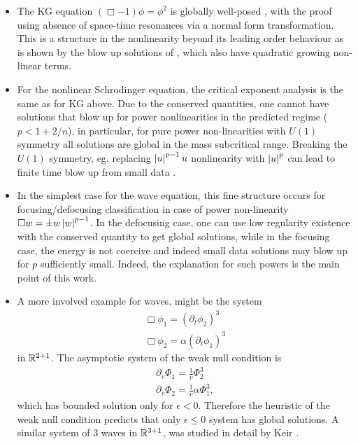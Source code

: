 \documentclass[11pt, oneside]{amsart}
\begin{document}
	\begin{itemize}
		\item The KG equation $(\Box-1)\phi=\phi^2$ is globally well-posed \cite{ozawa_global_1996}, with the proof using absence of space-time resonances via a normal form transformation. This is a structure in the nonlinearity beyond its leading order behaviour as is shown by the blow up solutions of \cite{keel_small_1999}, which also have quadratic growing non-linear terms.
		\item For the nonlinear Schrodinger equation, the critical exponent analysis is the same as for KG above. Due to the conserved quantities, one cannot have solutions that blow up for power nonlinearities in the predicted regime ($p<1+2/n$), in particular, for pure power non-linearities with $U(1)$ symmetry all solutions are global in the mass subcritical range. Breaking the $U(1)$ symmetry, eg. replacing $\left\lvert u\right\rvert^{p-1}u$ nonlinearity with $\left\lvert u\right\rvert^p$  can lead to finite time blow up from small data \cite{ikeda_small_2012}.
		\item In the simplest case for the wave equation, this fine structure occurs for focusing/defocusing classification in case of power non-linearity ${\Box w=\pm w\left\lvert w\right\rvert^{p-1}}$. In the defocusing case, one  can use low regularity existence with the conserved quantity to get global solutions, while in the focusing case, the energy is not coercive and indeed small data solutions may blow up for $p$ sufficiently small. Indeed, the explanation for such powers is the main point of this work.
		\item 	A more involved example for waves, might be the system
		\begin{equation*}
			\begin{gathered}
				\Box\phi_1=(\partial_t\phi_2)^3\\
				\Box\phi_2=\alpha(\partial_t\phi_1)^3
			\end{gathered}
		\end{equation*}
		in $\mathbb{R}^{2+1}$. The asymptotic system of the weak null condition is 
		\begin{equation*}
			\begin{gathered}
				\partial_v\Phi_1=\frac{1}{v}\Phi_2^3\\
				\partial_v\Phi_2=\frac{1}{v}\alpha\Phi_1^3,
			\end{gathered}
		\end{equation*}
		which has bounded solution only for $\epsilon<0$. Therefore the heuristic of the weak null condition predicts that only $\epsilon\leq0$ system has global solutions. A similar system of 3 waves in $\mathbb{R}^{3+1}$, was studied in detail by Keir \cite{keir_global_2019}.
	\end{itemize}
		
\end{document}
